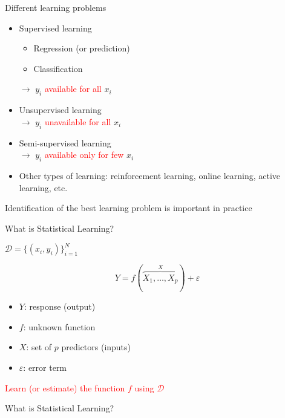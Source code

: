 \documentclass[14pt]{beamer}
\begin{document}
\begin{frame}{Different learning problems}

\begin{itemize}
	\item Supervised learning 
		\begin{itemize}
		\item Regression (or prediction)
		\item Classification
		\end{itemize}
	$\rightarrow$ $y_i$ \textcolor{red}{available for all} $x_i$
	\item Unsupervised learning \\
	$\rightarrow$ $y_i$ \textcolor{red}{unavailable for all} $x_i$
	\item Semi-supervised learning \\
	$\rightarrow$ $y_i$ \textcolor{red}{available only for few} $x_i$
	\item Other types of learning: reinforcement learning, online learning, active learning, etc. 
\end{itemize}

Identification of the best learning problem is important in practice

\end{frame}

\begin{frame}{What is Statistical Learning?}\large

$ \mathcal{D} = \{(x_i, y_i)\}_{i = 1}^N$

$$Y=f(\overbrace{X_1, \dots, X_p}^{X}) + \varepsilon$$

\begin{itemize}
	\item $Y$: response (output)
	\item $f$: unknown function
	\item $X$: set of $p$ predictors (inputs)
	\item $\varepsilon$: error term
\end{itemize}

\centerline{\textcolor{red}{Learn (or estimate) the function $f$ using $\mathcal{D}$}}

\vspace{.5cm}

\end{frame}

\begin{frame}{What is Statistical Learning?}\large



\end{frame}
\end{document}
